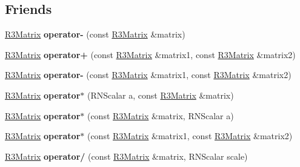 \subsection*{Friends}
\begin{DoxyCompactItemize}
\item 
\hyperlink{class_r3_matrix}{R3\+Matrix} {\bfseries operator-\/} (const \hyperlink{class_r3_matrix}{R3\+Matrix} \&matrix)\hypertarget{class_r3_matrix_a84ffdd083fd8a0b8fa54cd9f07e2ca03}{}\label{class_r3_matrix_a84ffdd083fd8a0b8fa54cd9f07e2ca03}

\item 
\hyperlink{class_r3_matrix}{R3\+Matrix} {\bfseries operator+} (const \hyperlink{class_r3_matrix}{R3\+Matrix} \&matrix1, const \hyperlink{class_r3_matrix}{R3\+Matrix} \&matrix2)\hypertarget{class_r3_matrix_a19aeaeca6ace1ef0b2320ab13a4c6e3f}{}\label{class_r3_matrix_a19aeaeca6ace1ef0b2320ab13a4c6e3f}

\item 
\hyperlink{class_r3_matrix}{R3\+Matrix} {\bfseries operator-\/} (const \hyperlink{class_r3_matrix}{R3\+Matrix} \&matrix1, const \hyperlink{class_r3_matrix}{R3\+Matrix} \&matrix2)\hypertarget{class_r3_matrix_a5e61dc4eddde46530ee9f455c0e93df1}{}\label{class_r3_matrix_a5e61dc4eddde46530ee9f455c0e93df1}

\item 
\hyperlink{class_r3_matrix}{R3\+Matrix} {\bfseries operator$\ast$} (R\+N\+Scalar a, const \hyperlink{class_r3_matrix}{R3\+Matrix} \&matrix)\hypertarget{class_r3_matrix_a9e92b5ef243bbece37ed080f1fb49aa7}{}\label{class_r3_matrix_a9e92b5ef243bbece37ed080f1fb49aa7}

\item 
\hyperlink{class_r3_matrix}{R3\+Matrix} {\bfseries operator$\ast$} (const \hyperlink{class_r3_matrix}{R3\+Matrix} \&matrix, R\+N\+Scalar a)\hypertarget{class_r3_matrix_a119632e728a127685cfc4fc1d8fc22a2}{}\label{class_r3_matrix_a119632e728a127685cfc4fc1d8fc22a2}

\item 
\hyperlink{class_r3_matrix}{R3\+Matrix} {\bfseries operator$\ast$} (const \hyperlink{class_r3_matrix}{R3\+Matrix} \&matrix1, const \hyperlink{class_r3_matrix}{R3\+Matrix} \&matrix2)\hypertarget{class_r3_matrix_a59635f30234336a3d81f607d10f9e784}{}\label{class_r3_matrix_a59635f30234336a3d81f607d10f9e784}

\item 
\hyperlink{class_r3_matrix}{R3\+Matrix} {\bfseries operator/} (const \hyperlink{class_r3_matrix}{R3\+Matrix} \&matrix, R\+N\+Scalar scale)\hypertarget{class_r3_matrix_a7a5ffa9ddd6528043eda24063ada0dcb}{}\label{class_r3_matrix_a7a5ffa9ddd6528043eda24063ada0dcb}


\end{DoxyCompactItemize}
